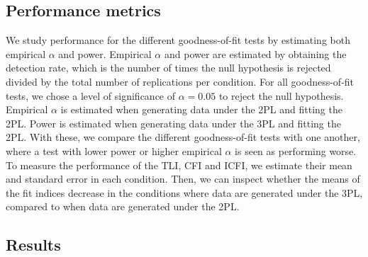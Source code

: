 \documentclass[Royal,sageapa,times,doublespace]{sagej}
\begin{document}
\subsection{Performance metrics}
We study performance for the different goodness-of-fit tests by estimating both empirical $\alpha$ and power. Empirical $\alpha$ and power are estimated by obtaining the detection rate, which is the number of times the null hypothesis is rejected divided by the total number of replications per condition. For all goodness-of-fit tests, we chose a level of significance of $\alpha = 0.05$ to reject the null hypothesis. Empirical $\alpha$ is estimated when generating data under the 2PL and fitting the 2PL. Power is estimated when generating data under the 3PL and fitting the 2PL. With these, we compare the different goodness-of-fit tests with one another, where a test with lower power or higher empirical $\alpha$ is seen as performing worse. \\
\indent To measure the performance of the TLI, CFI and ICFI, we estimate their mean and standard error in each condition. Then, we can inspect whether the means of the fit indices decrease in the conditions where data are generated under the 3PL, compared to when data are generated under the 2PL. 

\subsection{Results}
\end{document}
